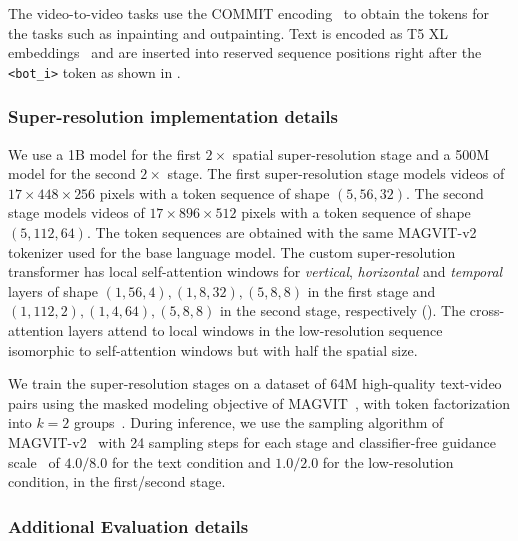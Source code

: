 The video-to-video tasks use the COMMIT encoding~\cite{yu2023magvit} to obtain the tokens for the tasks such as inpainting and outpainting.
Text is encoded as T5 XL embeddings~\cite{raffel2020exploring} and are inserted into reserved sequence positions right after the \texttt{<bot\_i>} token as shown in .
 





\subsubsection{Super-resolution implementation details} \label{sec:appendix-superres-details}
We use a 1B model for the first $2\times$ spatial super-resolution stage and a 500M model for the second $2\times$ stage.
The first super-resolution stage models videos of $17\times448\times256$ pixels with a  token sequence of shape $(5, 56, 32)$. The second stage models videos of $17\times896\times512$ pixels with a token sequence of shape $(5, 112, 64)$. The token sequences are obtained with the same MAGVIT-v2~\citep{yu2023language} tokenizer used for the base language model.
The custom super-resolution transformer has local self-attention windows for \emph{vertical}, \emph{horizontal} and \emph{temporal} layers of shape $(1, 56, 4), (1, 8, 32), (5, 8, 8)$ in the first stage and  $(1, 112, 2), (1, 4, 64), (5, 8, 8)$ in the second stage, respectively (). The cross-attention layers attend to local windows in the low-resolution sequence isomorphic to self-attention windows but with half the spatial size.

We train the super-resolution stages on a dataset of 64M high-quality text-video  pairs using the masked modeling objective of MAGVIT~\citep{yu2023magvit}, with token factorization into $k=2$ groups~\cite{yu2023language}. During inference, we use the sampling algorithm of MAGVIT-v2~\citep{yu2023language} with 24 sampling steps for each stage and classifier-free guidance scale~\citep{ho2022classifier,brooks2023instructpix2pix} of $4.0/8.0$ for the text condition and $1.0/2.0$ for the low-resolution condition, in the first/second stage.

\subsubsection{Additional Evaluation details}

